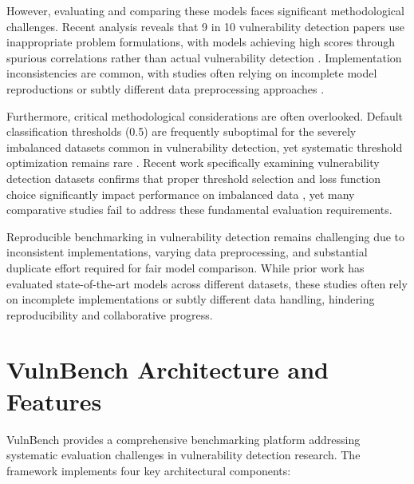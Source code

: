 \documentclass[letterpaper]{article}
\begin{document}
However, evaluating and comparing these models faces significant methodological challenges. Recent analysis reveals that 9 in 10 vulnerability detection papers use inappropriate problem formulations, with models achieving high scores through spurious correlations rather than actual vulnerability detection \citep{risse2025top}. Implementation inconsistencies are common, with studies often relying on incomplete model reproductions or subtly different data preprocessing approaches \citep{codecse2024}.

Furthermore, critical methodological considerations are often overlooked. Default classification thresholds (0.5) are frequently suboptimal for the severely imbalanced datasets common in vulnerability detection, yet systematic threshold optimization remains rare \citep{ghost2021, leevy2023optimal}. Recent work specifically examining vulnerability detection datasets confirms that proper threshold selection and loss function choice significantly impact performance on imbalanced data \citep{he2025imbalance}, yet many comparative studies fail to address these fundamental evaluation requirements.

Reproducible benchmarking in vulnerability detection remains challenging due to inconsistent implementations, varying data preprocessing, and substantial duplicate effort required for fair model comparison. While prior work has evaluated state-of-the-art models across different datasets, these studies often rely on incomplete implementations or subtly different data handling, hindering reproducibility and collaborative progress.

\section{VulnBench Architecture and Features}

VulnBench provides a comprehensive benchmarking platform addressing systematic evaluation challenges in vulnerability detection research. The framework implements four key architectural components:
\end{document}
